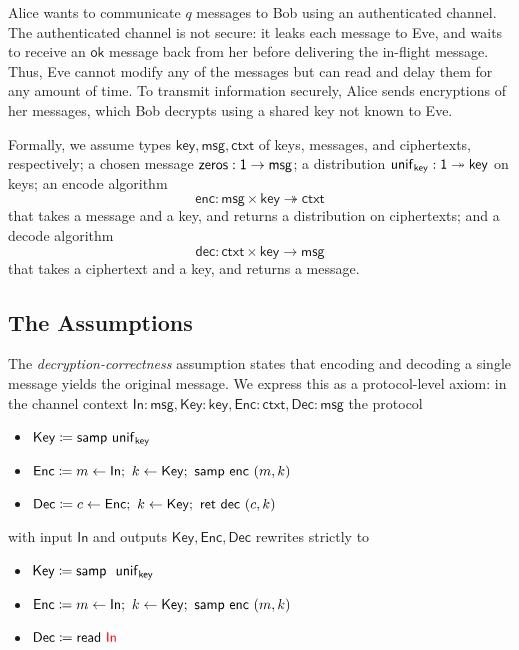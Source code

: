 \newcommand{\key}{\mathsf{key}}
\newcommand{\msg}{\mathsf{msg}}
\newcommand{\ctxt}{\mathsf{ctxt}}
\newcommand{\zeros}{\mathsf{zeros}}
\newcommand{\unif}{\mathsf{unif}}
\newcommand{\enc}{\mathsf{enc}}
\newcommand{\dec}{\mathsf{dec}}
\newcommand{\id}{\mathsf{id}}
\newcommand{\adv}{\mathsf{adv}}
\newcommand{\net}{\mathsf{net}}
\newcommand{\In}{\mathsf{In}}
\newcommand{\Out}{\mathsf{Out}}
\newcommand{\Key}{\mathsf{Key}}
\newcommand{\Send}{\mathsf{Send}}
\newcommand{\Recv}{\mathsf{Recv}}
\newcommand{\Enc}{\mathsf{Enc}}
\newcommand{\Dec}{\mathsf{Dec}}
\newcommand{\LeakMsgRcvd}{\mathsf{LeakMsgRcvd}}
\newcommand{\OkMsg}{\mathsf{OkMsg}}
\newcommand{\LeakCtxt}{\mathsf{LeakCtxt}}
\newcommand{\OkCtxt}{\mathsf{OkCtxt}}

Alice wants to communicate $q$ messages to Bob using an authenticated channel. The authenticated channel is not secure: it leaks each message to Eve, and waits to receive an $\mathsf{ok}$ message back from her before delivering the in-flight message. Thus, Eve cannot modify any of the messages but can read and delay them for any amount of time. To transmit information securely, Alice sends encryptions of her messages, which Bob decrypts using a shared key not known to Eve.

Formally, we assume types $\key, \msg, \ctxt$ of keys, messages, and ciphertexts, respectively; a chosen message $\zeros : \one \rightarrow \msg$; a distribution $\unif_\key : \one \twoheadrightarrow \key$ on keys; an encode algorithm
\[\enc : \msg \times \key \twoheadrightarrow \ctxt\]
that takes a message and a key, and returns a distribution on ciphertexts; and a decode algorithm
\[\dec : \ctxt \times \key \rightarrow \msg\]
that takes a ciphertext and a key, and returns a message.

\subsection{The Assumptions}
The \emph{decryption-correctness} assumption states that encoding and decoding a single message yields the original message. We express this as a protocol-level axiom: in the channel context $\In : \msg, \Key : \key, \Enc : \ctxt, \Dec : \msg$ the protocol
\begin{itemize}
\item $\Key \coloneqq \samp{\unif_\key}$
\item $\Enc \coloneqq m \leftarrow \In; \ k \leftarrow \Key; \ \samp{\enc \ (m,k)}$
\item $\Dec \coloneqq c \leftarrow \Enc; \ k \leftarrow \Key; \ \ret{\dec \ (c,k)}$
\end{itemize}
with input $\In$ and outputs $\Key, \Enc, \Dec$ rewrites strictly to
\begin{itemize}
\item $\Key \coloneqq \samp \ \unif_\key$
\item $\Enc \coloneqq m \leftarrow \In; \ k \leftarrow \Key; \ \samp{\enc \ (m,k)}$
\item $\Dec \coloneqq \read{{\color{red} \In}}$
\end{itemize}

